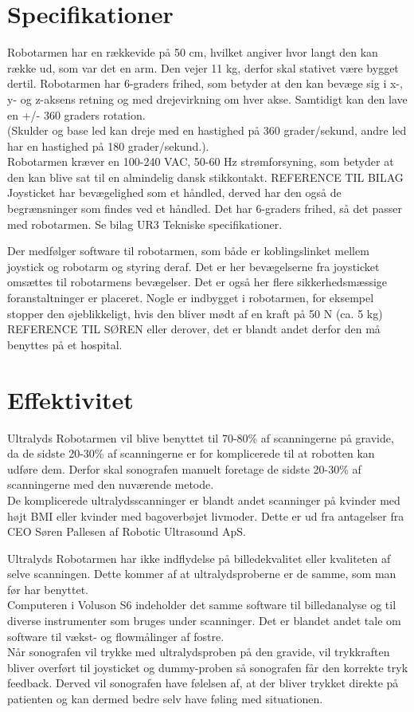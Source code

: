 \section{Specifikationer}
Robotarmen har en rækkevide på 50 cm, hvilket angiver hvor langt den kan række ud, som var det en arm. Den vejer 11 kg, derfor skal stativet være bygget dertil. Robotarmen har 6-graders frihed, som betyder at den kan bevæge sig i x-, y- og z-aksens retning og med drejevirkning om hver akse. Samtidigt kan den lave en +/- 360 graders rotation. \\
(Skulder og base led kan dreje med en hastighed på 360 grader/sekund,  andre led har en hastighed på 180 grader/sekund.). \\
Robotarmen kræver en 100-240 VAC, 50-60 Hz strømforsyning, som betyder at den kan blive sat til en almindelig dansk stikkontakt. REFERENCE TIL BILAG
\newline 
Joysticket har bevægelighed som et håndled, derved har den også de begrænsninger som findes ved et håndled. Det har 6-graders frihed, så det passer med robotarmen. Se bilag UR3 Tekniske specifikationer. 

Der medfølger software til robotarmen, som både er koblingslinket mellem joystick og robotarm og styring deraf. Det er her bevægelserne fra joysticket omsættes til robotarmens bevægelser. Det er også her flere sikkerhedsmæssige foranstaltninger er placeret. Nogle er indbygget i robotarmen, for eksempel stopper den øjeblikkeligt, hvis den bliver mødt af en kraft på 50 N (ca. 5 kg) REFERENCE TIL SØREN eller derover, det er blandt andet derfor den må benyttes på et hospital.    

\section{Effektivitet}
Ultralyds Robotarmen vil blive benyttet til 70-80\% af scanningerne på gravide, da de sidste 20-30\% af scanningerne er for komplicerede til at robotten kan udføre dem. Derfor skal sonografen manuelt foretage de sidste 20-30\% af scanningerne med den nuværende metode. \\ 
De komplicerede ultralydsscanninger er blandt andet scanninger på kvinder med højt BMI eller kvinder med bagoverbøjet livmoder. Dette er ud fra antagelser fra CEO Søren Pallesen af Robotic Ultrasound ApS. 
 
Ultralyds Robotarmen har ikke indflydelse på billedekvalitet eller kvaliteten af selve scanningen. Dette kommer af at ultralydsproberne er de samme, som man før har benyttet. \\Computeren i Voluson S6 indeholder det samme software til billedanalyse og til diverse instrumenter som bruges under scanninger. Det er blandet andet tale om software til vækst- og flowmålinger af fostre.   \\
Når sonografen vil trykke med ultralydsproben på den gravide, vil trykkraften bliver overført til joysticket og dummy-proben så sonografen får den korrekte tryk feedback. Derved vil sonografen have følelsen af, at der bliver trykket direkte på patienten og kan dermed bedre selv have føling med situationen. 

